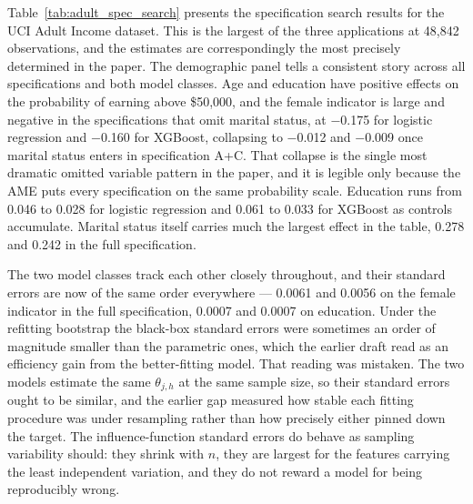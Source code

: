 \documentclass[12pt]{article}
\begin{document}
	Table~\ref{tab:adult_spec_search} presents the specification search results for the UCI Adult Income dataset. This is the largest of the three applications at 48,842 observations, and the estimates are correspondingly the most precisely determined in the paper. The demographic panel tells a consistent story across all specifications and both model classes. Age and education have positive effects on the probability of earning above \$50,000, and the female indicator is large and negative in the specifications that omit marital status, at $-$0.175 for logistic regression and $-$0.160 for XGBoost, collapsing to $-$0.012 and $-$0.009 once marital status enters in specification A+C. That collapse is the single most dramatic omitted variable pattern in the paper, and it is legible only because the AME puts every specification on the same probability scale. Education runs from 0.046 to 0.028 for logistic regression and 0.061 to 0.033 for XGBoost as controls accumulate. Marital status itself carries much the largest effect in the table, 0.278 and 0.242 in the full specification.

	The two model classes track each other closely throughout, and their standard errors are now of the same order everywhere --- 0.0061 and 0.0056 on the female indicator in the full specification, 0.0007 and 0.0007 on education. Under the refitting bootstrap the black-box standard errors were sometimes an order of magnitude smaller than the parametric ones, which the earlier draft read as an efficiency gain from the better-fitting model. That reading was mistaken. The two models estimate the same $\theta_{j,h}$ at the same sample size, so their standard errors ought to be similar, and the earlier gap measured how stable each fitting procedure was under resampling rather than how precisely either pinned down the target. The influence-function standard errors do behave as sampling variability should: they shrink with $n$, they are largest for the features carrying the least independent variation, and they do not reward a model for being reproducibly wrong.
\end{document}
